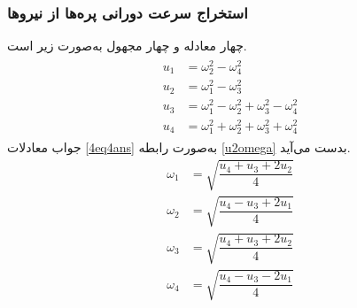 \subsubsection{استخراج سرعت دورانی پره‌ها از نیروها}
چهار معادله و چهار مجهول به‌صورت زیر است.
\begin{align}\label{4eq4ans}
	\begin{split}
		u_1 &= \omega_2^2 - \omega_4^2\\
		u_2 &= \omega_1^2 - \omega_3^2\\
		u_3 &= \omega_1^2 - \omega_2^2  + \omega_3^2 - \omega_4^2\\
		u_4 &= \omega_1^2 + \omega_2^2  + \omega_3^2 + \omega_4^2
	\end{split}
\end{align}
جواب معادلات 
\ref{4eq4ans}
به‌صورت رابطه 
\ref{u2omega}
بدست می‌آید.
\begin{equation}\label{u2omega}
	\begin{split}
		\omega_1 &= \sqrt{\dfrac{u_4 + u_3 +2u_2}{4}}\\[1em]
		\omega_2 &= \sqrt{\dfrac{u_4 - u_3 +2u_1}{4}}\\[1em]
		\omega_3 &= \sqrt{\dfrac{u_4 + u_3 +2u_2}{4}}\\[1em]
		\omega_4 &= \sqrt{\dfrac{u_4 - u_3 -2u_1}{4}}
	\end{split}
\end{equation}
